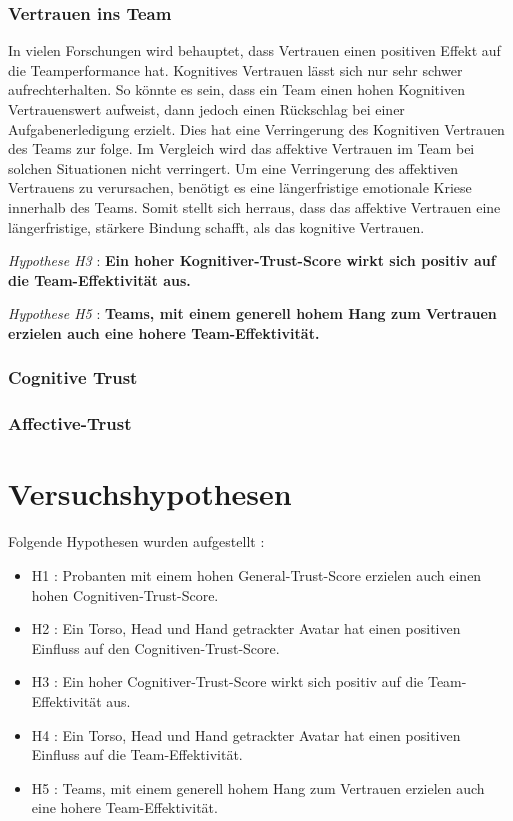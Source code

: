 \documentclass[a4paper,11pt]{article}%
\renewcommand{\\}{\vspace*{0.5\baselineskip} \newline}
\begin{document}
\subsubsection{Vertrauen ins Team}

In vielen Forschungen wird behauptet, dass Vertrauen einen positiven Effekt auf die Teamperformance hat. \citep{mcallister1995affect} \citep{mayer1995integrative} \citep{dirks2002trust}
Kognitives Vertrauen lässt sich nur sehr schwer aufrechterhalten. So könnte es sein, dass ein Team einen hohen Kognitiven Vertrauenswert aufweist, dann jedoch einen Rückschlag bei einer Aufgabenerledigung erzielt. Dies hat eine Verringerung des Kognitiven Vertrauen des Teams zur folge. \citep[p.29-31]{mcallister1995affect}
Im Vergleich wird das affektive Vertrauen im Team bei solchen Situationen nicht verringert. Um eine Verringerung des affektiven Vertrauens zu verursachen, benötigt es eine längerfristige emotionale Kriese innerhalb des Teams. Somit stellt sich herraus, dass das affektive Vertrauen eine längerfristige, stärkere Bindung schafft, als das kognitive Vertrauen.  \citep[p.29-31]{mcallister1995affect} \\

\textit{Hypothese H3} : \textbf{Ein hoher Kognitiver-Trust-Score wirkt sich positiv auf die Team-Effektivität aus.}\\

\textit{Hypothese H5} : \textbf{Teams, mit einem generell hohem Hang zum Vertrauen erzielen auch eine hohere Team-Effektivität.}

		\subsubsection{Cognitive Trust}
		
		\subsubsection{Affective-Trust}
		
	\newpage
	\section{Versuchshypothesen}

Folgende Hypothesen wurden aufgestellt :
\begin{itemize}
	\item{H1 : Probanten mit einem hohen General-Trust-Score erzielen auch einen hohen Cognitiven-Trust-Score.}
	\item{H2 : Ein Torso, Head und Hand getrackter Avatar hat einen positiven Einfluss auf den Cognitiven-Trust-Score.}
	\item{H3 : Ein hoher Cognitiver-Trust-Score wirkt sich positiv auf die Team-Effektivität aus.}
	\item{H4 : Ein Torso, Head und Hand getrackter Avatar hat einen positiven Einfluss auf die Team-Effektivität.}
	\item{H5 : Teams, mit einem generell hohem Hang zum Vertrauen erzielen auch eine hohere Team-Effektivität.}
\end{itemize}
\end{document}
